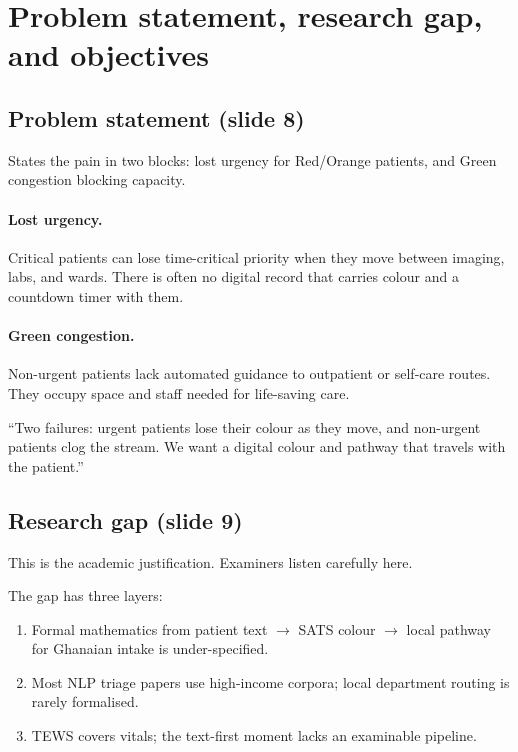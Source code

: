 \section{Problem statement, research gap, and objectives}
\label{sec:problem}

\subsection{Problem statement (slide 8)}

\begin{whybox}
States the pain in two blocks: lost urgency for Red/Orange patients, and Green congestion blocking capacity.
\end{whybox}

\paragraph{Lost urgency.}
Critical patients can lose time-critical priority when they move between imaging, labs, and wards.
There is often no digital record that carries colour and a countdown timer with them.

\paragraph{Green congestion.}
Non-urgent patients lack automated guidance to outpatient or self-care routes.
They occupy space and staff needed for life-saving care.

\begin{saybox}
``Two failures: urgent patients lose their colour as they move, and non-urgent patients clog the stream. We want a digital colour and pathway that travels with the patient.''
\end{saybox}

\subsection{Research gap (slide 9)}

\begin{whybox}
This is the academic justification. Examiners listen carefully here.
\end{whybox}

The gap has three layers:
\begin{enumerate}
  \item Formal mathematics from patient text \(\to\) SATS colour \(\to\) local pathway for Ghanaian intake is under-specified.
  \item Most NLP triage papers use high-income corpora; local department routing is rarely formalised.
  \item TEWS covers vitals; the text-first moment lacks an examinable pipeline.
\end{enumerate}

